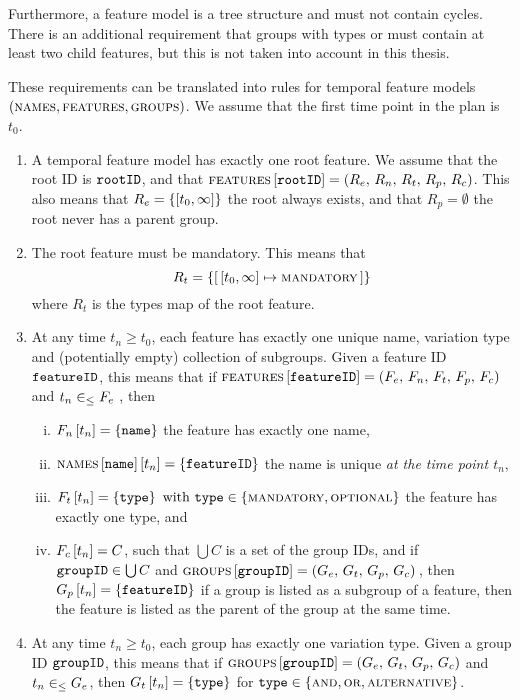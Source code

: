 Furthermore, a feature model is a tree structure and must not contain cycles. There is an additional requirement that groups with types \xortype{} or \ortype{} must contain at least two child features, but this is not taken into account in this thesis.

These requirements can be translated into rules for temporal feature models $(\textsc{names}, \textsc{features}, \textsc{groups}{})$. We assume that the first time point in the plan is $t_0$.

\begin{enumerate}[\wf{\arabic*}, itemsep=0mm]
   \item A temporal feature model has exactly one root feature. We assume that the root ID is $\texttt{rootID}$, and that $\textsc{features} \left[ \texttt{rootID} \right] = \left(R_e,\, R_n,\, R_t,\, R_p,\, R_c\right)$. This also means that $R_e=\set{\interval{t_0}{\forever}}$ \textemdash{} the root always exists, and that $R_p = \emptyset$ \textemdash{} the root never has a parent group.
\item The root feature must be mandatory. This means that $$R_t  = \set{\intervalmapping{t_0}{\forever}{\mandatory}}$$ where $R_t$ is the types map of the root feature. 
\item At any time $t_n \geq t_0$, each feature has exactly one unique name, variation type and (potentially empty) collection of subgroups. Given a feature ID $\texttt{featureID}$, this means that if $\textsc{features} \left[ \texttt{featureID} \right] = \left(F_e,\, F_n,\, F_t,\, F_p,\, F_c\right)$ and $t_n \in_\leq F_e$ , then
   \begin{enumerate}[(i)]
      \item $F_n \left[ t_n \right] = \left\{\texttt{name}\right\}$ \textemdash{} the feature has exactly one name,
      \item $\textsc{names} \left[ \texttt{name} \right] \left[ t_n \right] = \left\{\texttt{featureID}\right\}$ \textemdash{} the name is unique \emph{at the time point $t_n$},
      \item $F_t \left[ t_n \right] = \left\{\texttt{type}\right\} \text{ with } \texttt{type} \in \left\{\textsc{mandatory}, \textsc{optional}\right\}$ \textemdash{} the feature has exactly one type, and
      \item $F_c \left[ t_n \right] = C$, such that $\bigcup C$ is a set of the group IDs, and if $\texttt{groupID} \in \bigcup C$ and $\textsc{groups}{} \left[ \texttt{groupID} \right] = \left(G_e,\, G_t,\, G_p,\, G_c\right){}$, then $G_p \left[ t_n \right] = \left\{\texttt{featureID}\right\}$ \textemdash{} if a group is listed as a subgroup of a feature, then the feature is listed as the parent of the group at the same time.
   \end{enumerate}
   \item At any time $t_n \geq t_0$, each group has exactly one variation type. Given a group ID $\texttt{groupID}$, this means that if $\textsc{groups}{} \left[ \texttt{groupID} \right] = \left(G_e,\, G_t,\, G_p,\, G_c\right)$ and $t_n \in_\leq G_e$, then $G_t \left[ t_n \right] = \left\{\texttt{type}\right\}$ for $\texttt{type} \in \left\{\textsc{and}, \textsc{or}, \textsc{alternative}\right\}$.

\end{enumerate}
